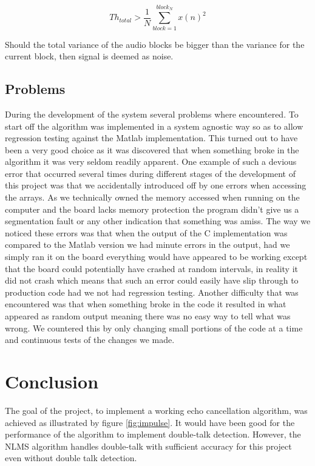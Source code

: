 \documentclass[a4paper,11pt,twoside]{article}
\begin{document}
\begin{equation}
Th_{total} > \frac{1}{N} \sum_{block = 1}^{block_{N}} x(n)^2
\end{equation}

Should the total variance of the audio blocks be bigger than the variance for the current block, then signal is deemed as noise.

\subsection{Problems}
During the development of the system several problems where encountered. To start off  the algorithm was implemented in a system agnostic way so as to allow regression testing against the Matlab implementation. This turned out to have been a very good choice as it was discovered that when something broke in the algorithm it was very seldom readily apparent. One example of such a devious error that occurred several times during different stages of the development of this project was that we accidentally introduced off by one errors when accessing the arrays. As we technically owned the memory accessed when running on the computer and the board lacks memory protection the program didn’t give us a segmentation fault or any other indication that something was amiss. The way we noticed these errors was that when the output of the C implementation was compared to the Matlab version we had minute errors in the output, had we simply ran it on the board everything would have appeared to be working except that the board could potentially have crashed at random intervals, in reality it did  not crash which means that such an error could easily have slip through to production code had we not had regression testing. Another difficulty that was encountered was that when something broke in the code it resulted in what appeared as random output meaning there was no easy way to tell what was wrong. We countered this by only changing small portions of the code at a time and continuous tests of the changes we made.


\section{Conclusion}
The goal of the project, to implement a working echo cancellation algorithm, was achieved as illustrated by figure \ref{fig:impulse}. It would have been good for the performance of the algorithm to implement double-talk\cite{1} detection. However,  the NLMS algorithm handles double-talk with sufficient accuracy for this project even without double talk detection. 
\end{document}
